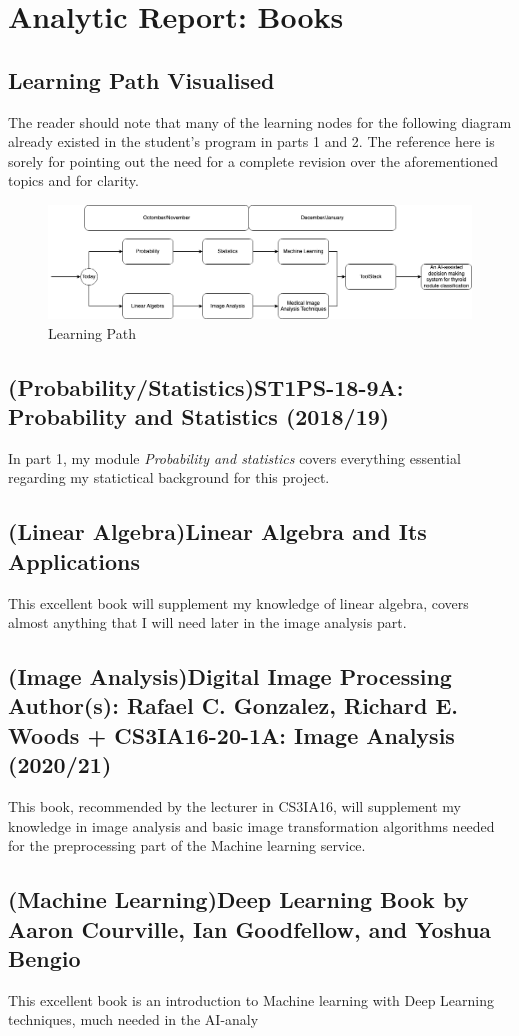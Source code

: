 	\section{Analytic Report: Books}
	\subsection{Learning Path Visualised}
	The reader should note that many of the learning nodes for the following diagram already existed in the student's program in parts 1 and 2. The reference here is sorely for pointing out the need for a complete revision over the aforementioned topics and for clarity.
	\begin{figure}[H]
		\iftrue
		\caption{Learning Path}
		\centering
		\includegraphics[scale=0.3]{figures/path}
		\fi
	\end{figure}
	\subsection{(Probability/Statistics)ST1PS-18-9A: Probability and Statistics (2018/19)}
	In part 1, my module \textit{Probability and statistics} covers everything essential regarding my statictical background for this project.
	\subsection{(Linear Algebra)Linear Algebra and Its Applications}
	This excellent book will supplement my knowledge of linear algebra, covers almost anything that I will need later in the image analysis part.
	\subsection{(Image Analysis)Digital Image Processing Author(s): Rafael C. Gonzalez, Richard E. Woods + CS3IA16-20-1A: Image Analysis (2020/21)}
	This book, recommended by the lecturer in CS3IA16, will supplement my knowledge in image analysis and basic image transformation algorithms needed for the preprocessing part of the Machine learning service. 
	\subsection{(Machine Learning)Deep Learning Book by Aaron Courville, Ian Goodfellow, and Yoshua Bengio}
	This excellent book is an introduction to Machine learning with Deep Learning techniques, much needed in the AI-analy
